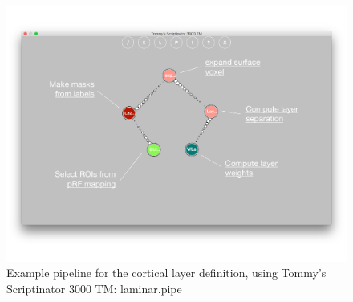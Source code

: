 \documentclass[12pt,a4paper]{scrartcl}
\begin{document}
\begin{figure}[h]
\begin{center}
\includegraphics[width=\textwidth]{laminar-pipe}
\caption[Laminar definition Pipeline]{Example pipeline for the cortical layer definition, using Tommy's Scriptinator 3000 TM: laminar.pipe}
\end{center}
\end{figure}
\end{document}
